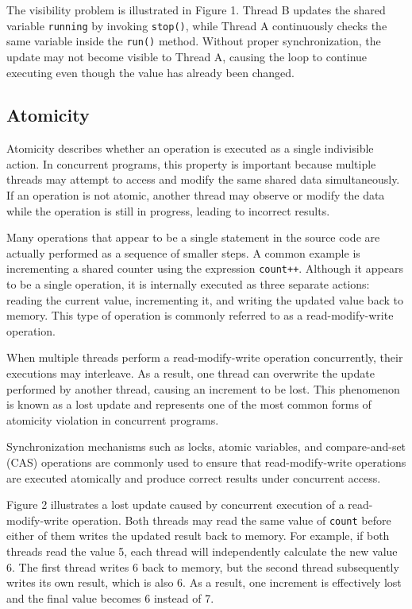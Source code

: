 
The visibility problem is illustrated in Figure 1. Thread B updates the shared variable \texttt{running} by invoking \texttt{stop()}, while Thread A continuously checks the same variable inside the \texttt{run()} method. Without proper synchronization, the update may not become visible to Thread A, causing the loop to continue executing even though the value has already been changed.

\subsection{Atomicity}
Atomicity describes whether an operation is executed as a single indivisible action. In concurrent programs, this property is important because multiple threads may attempt to access and modify the same shared data simultaneously. If an operation is not atomic, another thread may observe or modify the data while the operation is still in progress, leading to incorrect results. \cite{java-concurrency}

Many operations that appear to be a single statement in the source code are actually performed as a sequence of smaller steps. A common example is incrementing a shared counter using the expression \texttt{count++}. Although it appears to be a single operation, it is internally executed as three separate actions: reading the current value, incrementing it, and writing the updated value back to memory. This type of operation is commonly referred to as a read-modify-write operation.

When multiple threads perform a read-modify-write operation concurrently, their executions may interleave. As a result, one thread can overwrite the update performed by another thread, causing an increment to be lost. This phenomenon is known as a lost update and represents one of the most common forms of atomicity violation in concurrent programs.

Synchronization mechanisms such as locks, atomic variables, and compare-and-set (CAS) operations are commonly used to ensure that read-modify-write operations are executed atomically and produce correct results under concurrent access.


Figure 2 illustrates a lost update caused by concurrent execution of a read-modify-write operation. Both threads may read the same value of \texttt{count} before either of them writes the updated result back to memory. For example, if both threads read the value 5, each thread will independently calculate the new value 6. The first thread writes 6 back to memory, but the second thread subsequently writes its own result, which is also 6. As a result, one increment is effectively lost and the final value becomes 6 instead of 7.

